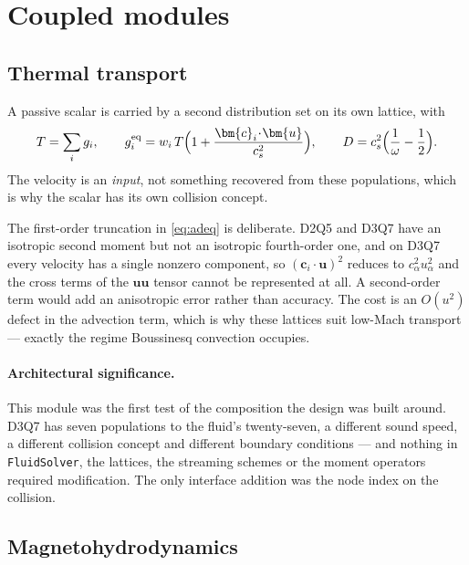\documentclass[11pt,a4paper]{article}
\newcommand{\code}[1]{\texttt{\small #1}}
\newcommand{\cs}{c_s}
\newcommand{\ci}{\bm{c}_i}
\newcommand{\uu}{\bm{u}}
\begin{document}
\section{Coupled modules}

\subsection{Thermal transport}

A passive scalar is carried by a second distribution set on its own lattice, with
\begin{equation}
  T = \sum_i g_i, \qquad
  g_i^{\rm eq} = w_i\,T\Big(1 + \frac{\ci\!\cdot\!\uu}{\cs^2}\Big), \qquad
  D = \cs^2\Big(\frac{1}{\omega}-\frac12\Big).
  \label{eq:adeq}
\end{equation}
The velocity is an \emph{input}, not something recovered from these populations,
which is why the scalar has its own collision concept.

The first-order truncation in \eqref{eq:adeq} is deliberate. D2Q5 and D3Q7 have an
isotropic second moment but not an isotropic fourth-order one, and on D3Q7 every
velocity has a single nonzero component, so $(\ci\!\cdot\!\uu)^2$ reduces to
$c_\alpha^2u_\alpha^2$ and the cross terms of the $\uu\uu$ tensor cannot be
represented at all. A second-order term would add an anisotropic error rather
than accuracy. The cost is an $O(u^2)$ defect in the advection term, which is why
these lattices suit low-Mach transport --- exactly the regime Boussinesq
convection occupies.

\paragraph{Architectural significance.} This module was the first test of the
composition the design was built around. D3Q7 has seven populations to the
fluid's twenty-seven, a different sound speed, a different collision concept and
different boundary conditions --- and nothing in \code{FluidSolver}, the lattices,
the streaming schemes or the moment operators required modification. The only
interface addition was the node index on the collision.

\subsection{Magnetohydrodynamics}
\end{document}
